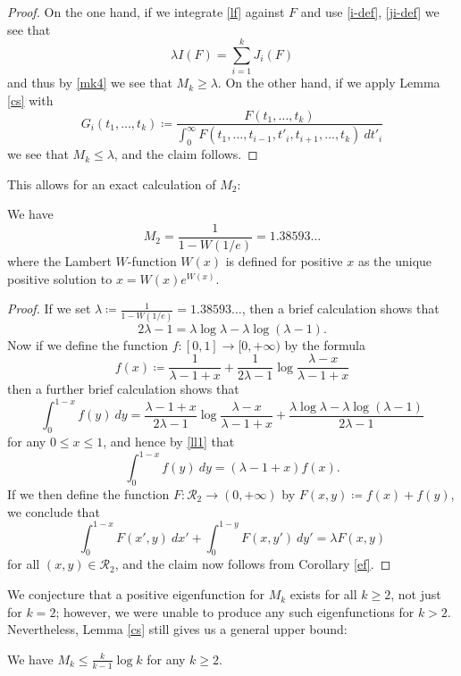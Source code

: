 \begin{proof}  On the one hand, if we integrate \eqref{lf} against $F$ and use \eqref{i-def}, \eqref{ji-def} we see that
$$ \lambda I(F) = \sum_{i=1}^k J_i(F)$$
and thus by \eqref{mk4} we see that $M_k \geq \lambda$.  On the other hand, if we apply Lemma \ref{cs} with
$$ G_i(t_1,\dots,t_k) \coloneqq \frac{F(t_1,\dots,t_k)}{\int_0^\infty F(t_1,\dots,t_{i-1},t'_i, t_{i+1},\dots,t_k)\ dt'_i}$$
we see that $M_k \leq \lambda$, and the claim follows.
\end{proof}

This allows for an exact calculation of $M_2$:

\begin{corollary}[Computation of $M_2$]\label{m2-comp}
We have 
$$M_2 = \frac{1}{1 - W(1/e)} = 1.38593\dots$$
where the Lambert $W$-function $W(x)$ is defined for positive $x$ as the unique positive solution to $x = W(x) e^{W(x)}$.
\end{corollary}

\begin{proof}  If we set $\lambda \coloneqq \frac{1}{1-W(1/e)} = 1.38593\dots$, then a brief calculation shows that
\begin{equation}\label{ll1}
 2\lambda - 1 = \lambda \log \lambda - \lambda \log(\lambda-1).
\end{equation}
Now if we define the function $f: [0,1] \to [0,+\infty)$ by the formula
$$ f(x) \coloneqq \frac{1}{\lambda-1+x} + \frac{1}{2\lambda-1} \log \frac{\lambda-x}{\lambda-1+x}$$
then a further brief calculation shows that
$$ \int_0^{1-x} f(y)\ dy = \frac{\lambda-1+x}{2\lambda-1} \log \frac{\lambda-x}{\lambda-1+x} + \frac{\lambda \log \lambda - \lambda \log(\lambda-1)}{2\lambda-1}$$
for any $0 \leq x \leq 1$, and hence by \eqref{ll1} that
$$ \int_0^{1-x} f(y)\ dy = (\lambda-1+x) f(x).$$
If we then define the function $F: {\mathcal R}_2 \to (0,+\infty)$ by $F(x,y) \coloneqq f(x) + f(y)$, we conclude that
$$ \int_0^{1-x} F(x',y)\ dx' + \int_0^{1-y} F(x,y')\ dy' = \lambda F(x,y)$$
for all $(x,y) \in {\mathcal R}_2$, and the claim now follows from Corollary \ref{ef}.
\end{proof}

We conjecture that a positive eigenfunction for $M_k$ exists for all $k \geq 2$, not just for $k=2$; however, we were unable to produce any such eigenfunctions for $k>2$.  Nevertheless, Lemma \ref{cs} still gives us a general upper bound:

\begin{corollary}\label{mk-upper}  We have $M_k \leq \frac{k}{k-1} \log k$ for any $k \geq 2$.
\end{corollary}

